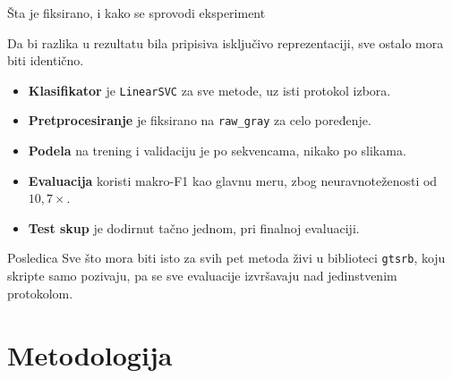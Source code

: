 \documentclass[aspectratio=169, 10pt]{beamer}
\begin{document}
\begin{frame}{Šta je fiksirano, i kako se sprovodi eksperiment}

Da bi razlika u rezultatu bila pripisiva \alert{isključivo reprezentaciji}, sve ostalo mora
biti identično.

\begin{itemize}
  \item \textbf{Klasifikator} je \texttt{LinearSVC} za sve metode, uz isti protokol izbora.
  \item \textbf{Pretprocesiranje} je fiksirano na \texttt{raw\_gray} za celo poređenje.
  \item \textbf{Podela} na trening i validaciju je po sekvencama, nikako po slikama.
  \item \textbf{Evaluacija} koristi makro-F1 kao glavnu meru, zbog neuravnoteženosti
        od $10{,}7\times$.
  \item \textbf{Test skup} je dodirnut tačno jednom, pri finalnoj evaluaciji.
\end{itemize}

\begin{alertblock}{Posledica}
Sve što mora biti isto za svih pet metoda živi u biblioteci \texttt{gtsrb}, koju skripte samo
pozivaju, pa se sve evaluacije izvršavaju nad jedinstvenim protokolom.
\end{alertblock}

\end{frame}

\section{Metodologija}
\end{document}
